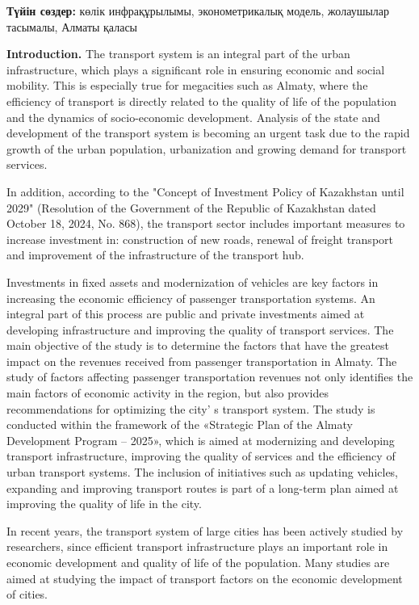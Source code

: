 {\bfseries Түйін сөздер:} көлік инфрақұрылымы, эконометрикалық модель,
жолаушылар тасымалы, Алматы қаласы

{\bfseries Introduction.} The transport system is an integral part of the
urban infrastructure, which plays a significant role in ensuring
economic and social mobility. This is especially true for megacities
such as Almaty, where the efficiency of transport is directly related to
the quality of life of the population and the dynamics of socio-economic
development. Analysis of the state and development of the transport
system is becoming an urgent task due to the rapid growth of the urban
population, urbanization and growing demand for transport services.

In addition, according to the "Concept of Investment Policy of
Kazakhstan until 2029" (Resolution of the Government of the Republic of
Kazakhstan dated October 18, 2024, No. 868), the transport sector
includes important measures to increase investment in: construction of
new roads, renewal of freight transport and improvement of the
infrastructure of the transport hub.

Investments in fixed assets and modernization of vehicles are key
factors in increasing the economic efficiency of passenger
transportation systems. An integral part of this process are public and
private investments aimed at developing infrastructure and improving the
quality of transport services. The main objective of the study is to
determine the factors that have the greatest impact on the revenues
received from passenger transportation in Almaty. The study of factors
affecting passenger transportation revenues not only identifies the main
factors of economic activity in the region, but also provides
recommendations for optimizing the city' s transport
system. The study is conducted within the framework of the «Strategic
Plan of the Almaty Development Program -- 2025», which is aimed at
modernizing and developing transport infrastructure, improving the
quality of services and the efficiency of urban transport systems. The
inclusion of initiatives such as updating vehicles, expanding and
improving transport routes is part of a long-term plan aimed at
improving the quality of life in the city.

In recent years, the transport system of large cities has been actively
studied by researchers, since efficient transport infrastructure plays
an important role in economic development and quality of life of the
population. Many studies are aimed at studying the impact of transport
factors on the economic development of cities.

